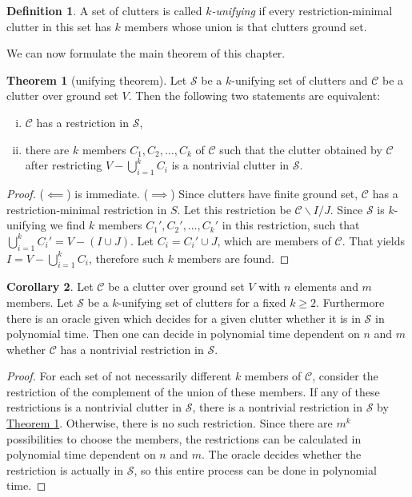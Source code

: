 \documentclass[a4paper, 12pt]{scrbook}
\theoremstyle{definition}
\newtheorem*{definition}{Definition}
\newtheorem{theorem}{Theorem}[chapter]
\newtheorem{corollary}[theorem]{Corollary}
\begin{document}
   \begin{definition}
       A set of clutters is called \emph{$k$-unifying} if every restriction-minimal clutter in this set has $k$ members whose union is that clutters ground set.
   \end{definition}

   We can now formulate the main theorem of this chapter.

   \begin{theorem}[unifying theorem]\label{unifying}
       Let $\mathcal{S}$ be a $k$-unifying set of clutters and $\mathcal{C}$ be a clutter over ground set $V$.
       Then the following two statements are equivalent:
       \leavevmode
       \begin{enumerate}[(i)]
           \item $\mathcal{C}$ has a restriction in $\mathcal{S}$,
           \item there are $k$ members $C_1, C_2, \ldots, C_k$ of $\mathcal{C}$ such that the clutter obtained by $\mathcal{C}$ after restricting $V - \bigcup_{i=1}^k C_i$ is a nontrivial clutter in $\mathcal{S}$.
       \end{enumerate}
   \end{theorem}

   \begin{proof}
       ($\impliedby$) is immediate.
       ($\implies$) Since clutters have finite ground set, $\mathcal{C}$ has a restriction-minimal restriction in $S$.
       Let this restriction be $\mathcal{C}\backslash I / J$.
       Since $\mathcal{S}$ is $k$-unifying we find $k$ members $C_1', C_2', \ldots, C_k'$ in this restriction, such that $\bigcup_{i=1}^k C_i' = V - (I \cup J)$.
       Let $C_i = C_i' \cup J$, which are members of $\mathcal{C}$.
       That yields $I=V-\bigcup_{i=1}^k C_i$, therefore such $k$ members are found.
   \end{proof}
   \begin{corollary}
       Let $\mathcal{C}$ be a clutter over ground set $V$ with $n$ elements and $m$ members.
       Let $\mathcal{S}$ be a $k$-unifying set of clutters for a fixed $k\geq 2$.
       Furthermore there is an oracle given which decides for a given clutter whether it is in $\mathcal{S}$ in polynomial time.
       Then one can decide in polynomial time dependent on $n$ and $m$ whether $\mathcal{C}$ has a nontrivial restriction in $\mathcal{S}$.
   \end{corollary}

   \begin{proof}
       For each set of not necessarily different $k$ members of $\mathcal{C}$, consider the restriction of the complement of the union of these members.
       If any of these restrictions is a nontrivial clutter in $\mathcal{S}$, there is a nontrivial restriction in $\mathcal{S}$ by \hyperref[unifying]{Theorem \ref*{unifying}}.
       Otherwise, there is no such restriction.
       Since there are $m^k$ possibilities to choose the members, the restrictions can be calculated in polynomial time dependent on $n$ and $m$. The oracle decides whether the restriction is actually in $\mathcal{S}$, so this entire process can be done in polynomial time.
   \end{proof}
\end{document}
